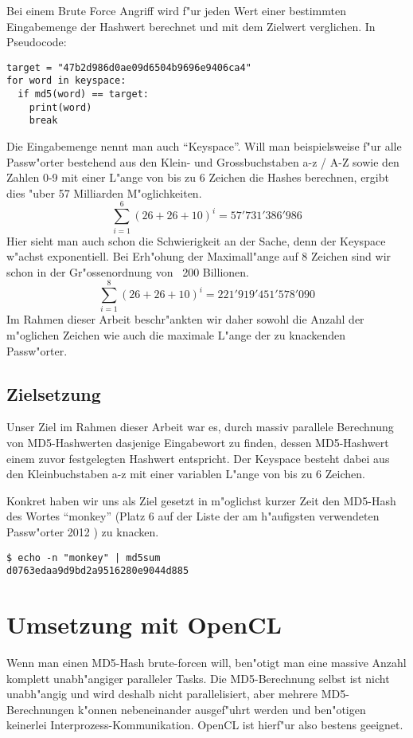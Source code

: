 \begin{refsection}
Bei einem Brute Force Angriff wird f"ur jeden Wert einer bestimmten
Eingabemenge der Hash\-wert berechnet und mit dem Zielwert verglichen. In
Pseudocode:

\begin{verbatim}
target = "47b2d986d0ae09d6504b9696e9406ca4"
for word in keyspace:
  if md5(word) == target:
    print(word)
    break
\end{verbatim}

\label{crypto:keyspace}
Die Eingabemenge nennt man auch ``Keyspace''. Will man beispielsweise f"ur alle
Passw"orter bestehend aus den Klein- und Grossbuchstaben a-z / A-Z sowie den
Zahlen 0-9 mit einer L"ange von bis zu 6 Zeichen die Hashes berechnen, ergibt
dies "uber 57 Milliarden M"oglichkeiten.
\[
	\sum_{i=1}^{6} \left(26 + 26 + 10\right)^i = 57'731'386'986
\]
Hier sieht man auch schon die Schwierigkeit an der Sache, denn der Keyspace
w"achst exponentiell. Bei Erh"ohung der Maximall"ange auf 8 Zeichen sind wir schon
in der Gr"ossenordnung von ~200 Billionen.
\[
	\sum_{i=1}^{8} \left(26 + 26 + 10\right)^i = 221'919'451'578'090
\]
Im Rahmen dieser Arbeit beschr"ankten wir daher sowohl die Anzahl der m"oglichen
Zeichen wie auch die maximale L"ange der zu knackenden Passw"orter.

\subsection{Zielsetzung}

Unser Ziel im Rahmen dieser Arbeit war es, durch massiv parallele Berechnung von
MD5-Hashwerten dasjenige Eingabewort zu finden, dessen MD5-Hashwert einem zuvor
festgelegten Hashwert entspricht. Der Keyspace besteht dabei aus den
Kleinbuchstaben a-z mit einer variablen L"ange von bis zu 6 Zeichen.

Konkret haben wir uns als Ziel gesetzt in m"oglichst kurzer Zeit den MD5-Hash
des Wortes ``monkey'' (Platz 6 auf der Liste der am h"aufigsten verwendeten
Passw"orter 2012 \cite{crypto:splash2012}) zu knacken.

\begin{verbatim}
$ echo -n "monkey" | md5sum
d0763edaa9d9bd2a9516280e9044d885
\end{verbatim}

\section{Umsetzung mit OpenCL}

Wenn man einen MD5-Hash brute-forcen will, ben"otigt man eine massive Anzahl
komplett unabh"angiger paralleler Tasks. Die MD5-Berechnung selbst ist nicht
unabh"angig und wird deshalb nicht parallelisiert, aber mehrere MD5-Berechnungen
k"onnen nebeneinander ausgef"uhrt werden und ben"otigen keinerlei
Interprozess-Kommunikation. OpenCL ist hierf"ur also bestens geeignet.


\end{refsection}
